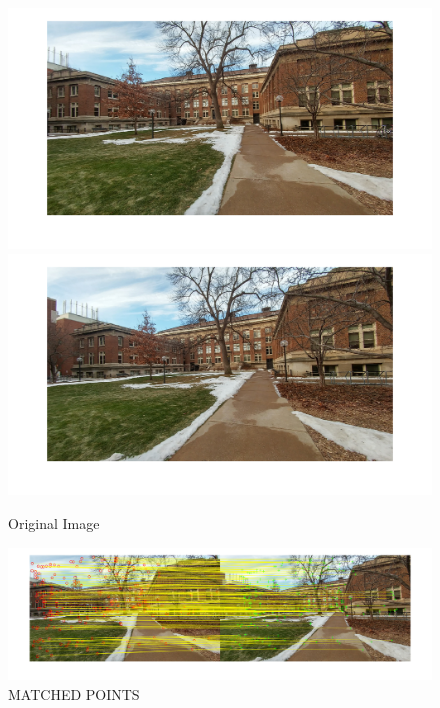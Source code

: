 \documentclass[letter, 10pt]{article}
\begin{document}
\begin{figure}[H]
        \centering
        \includegraphics[width=\textwidth]{HW5/RESULT/im1.png}
    \endminipage\hfill
        \centering
        \includegraphics[width=1\textwidth]{HW5/RESULT/im2.png}
    \endminipage\hfill
    \caption{Original Image}
\end{figure}

\begin{figure}[H]
    \centering
    \includegraphics[width=\textwidth]{HW5/RESULT/matched_points.png}
    \caption{MATCHED POINTS}
    \label{fig:my_label}
\end{figure}
\end{document}
